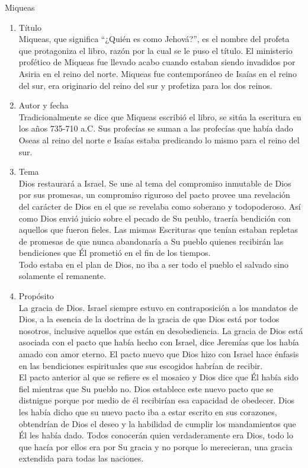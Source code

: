 %
%
\begin{section}{Miqueas}
	\begin{enumerate}
		\item Título\\
			Miqueas, que significa ``¿Quién es como Jehová?'', es el nombre del profeta que protagoniza el libro, razón por la cual se le puso el título. El ministerio profético de Miqueas fue llevado acabo cuando estaban siendo invadidos por Asiria en el reino del norte. Miqueas fue contemporáneo de Isaías en el reino del sur, era originario del reino del sur y profetiza para los dos reinos. 
		\item Autor y fecha\\
			Tradicionalmente se dice que Miqueas escribió el libro, se sitúa la escritura en los años 735-710 a.C. Sus profecías se suman a las profecías que había dado Oseas al reino del norte e Isaías estaba predicando lo mismo para el reino del sur.
		\item Tema\\
			Dios restaurará a Israel. Se une al tema del compromiso inmutable de Dios por sus promesas, un compromiso riguroso del pacto provee una revelación del carácter de Dios en el que se revelaba como soberano y todopoderoso. Así como Dios envió juicio sobre el pecado de Su peublo, traería bendición con aquellos que fueron fieles. Las mismas Escrituras que tenían estaban repletas de promesas de que nunca abandonaría a Su pueblo quienes recibirán las bendiciones que Él prometió en el fin de los tiempos.\\
			Todo estaba en el plan de Dios, no iba a ser todo el pueblo el salvado sino solamente el remanente.
		\item Propósito\\
			La gracia de Dios. Israel siempre estuvo en contraposición a los mandatos de Dios, a la esencia de la doctrina de la gracia de que Dios está por todos nosotros, inclusive aquellos que están en desobediencia. La gracia de Dios está asociada con el pacto que había hecho con Israel, dice Jeremías que los había amado con amor eterno. El pacto nuevo que Dios hizo con Israel hace énfasis en las bendiciones espirituales que sus escogidos habrían de recibir.\\
			El pacto anterior al que se refiere es el mosaico y Dios dice que Él había sido fiel mientras que Su pueblo no. Dios establece este nuevo pacto que se distnigue porque por medio de él recibirían esa capacidad de obedecer. Dios les había dicho que su nuevo pacto iba a estar escrito en sus corazones, obtendrían de Dios el deseo y la habilidad de cumplir los mandamientos que Él les había dado. Todos conocerán quien verdaderamente era Dios, todo lo que hacía por ellos era por Su gracia y no porque lo merecieran, una gracia extendida para todas las naciones.

\end{enumerate}
\end{section}
